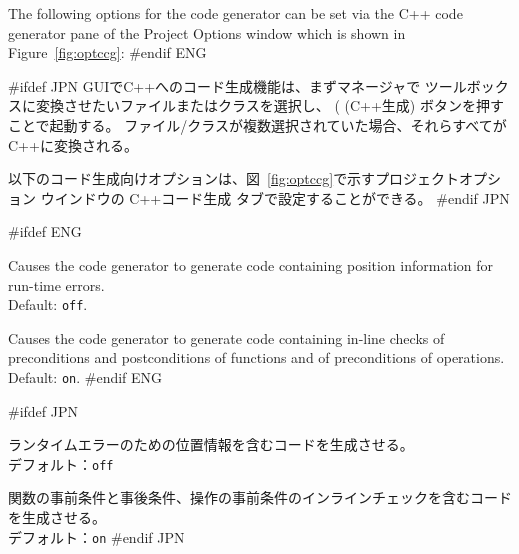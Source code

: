 \documentclass[\pformat,12pt]{article}
\newcommand{\guicmd}[1]{{\sf #1}}
\newcommand{\guicmd}[1]{{\gt #1}}
\begin{document}
The following options for the code generator can be set via the
\guicmd{C++ code generator} pane of the \guicmd{Project Options} window
which is shown in Figure~\ref{fig:optccg}:
#endif ENG

#ifdef JPN
GUIでC++へのコード生成機能は、まずマネージャで
ツールボックスに変換させたいファイルまたはクラスを選択し、 
(
(\guicmd{C++生成}) ボタンを押すことで起動する。
ファイル/クラスが複数選択されていた場合、それらすべてがC++に変換される。

以下のコード生成向けオプションは、図~\ref{fig:optccg}で示す\guicmd{プロジェクトオプション} ウインドウの
\guicmd{C++コード生成} タブで設定することができる。
#endif JPN

\begin{description}

#ifdef ENG
\item[Output position information] Causes the code
  generator to generate code containing position information for
  run-time errors. \\
  Default: \texttt{off}. 
\item[Check pre and post conditions] Causes the code
  generator to generate code containing in-line checks of
  preconditions and postconditions of functions and of preconditions
  of operations. \\
  Default: \texttt{on}. 
#endif ENG

#ifdef JPN
\item[位置情報を出力する]
  ランタイムエラーのための位置情報を含むコードを生成させる。 \\
  デフォルト：\texttt{off}
\item[事前／事後条件をチェックする]
  関数の事前条件と事後条件、操作の事前条件のインラインチェックを含むコードを生成させる。 \\
  デフォルト：\texttt{on}
#endif JPN

\end{description}
\end{document}
